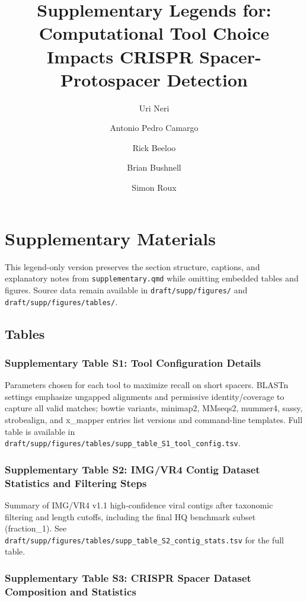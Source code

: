 \documentclass[
]{article}
\title{Supplementary Legends for: Computational Tool Choice Impacts
CRISPR Spacer-Protospacer Detection}
\author{Uri Neri \and Antonio Pedro Camargo \and Rick Beeloo \and Brian
Bushnell \and Simon Roux}
\date{}
\begin{document}
\maketitle


\section{Supplementary Materials}\label{supplementary-materials}

This legend-only version preserves the section structure, captions, and
explanatory notes from \texttt{supplementary.qmd} while omitting
embedded tables and figures. Source data remain available in
\texttt{draft/supp/figures/} and \texttt{draft/supp/figures/tables/}.

\subsection{Tables}\label{tables}

\subsubsection{Supplementary Table S1: Tool Configuration
Details}\label{tbl-supp-tool-config}

Parameters chosen for each tool to maximize recall on short spacers.
BLASTn settings emphasize ungapped alignments and permissive
identity/coverage to capture all valid matches; bowtie variants,
minimap2, MMseqs2, mummer4, sassy, strobealign, and x\_mapper entries
list versions and command-line templates. Full table is available in
\texttt{draft/supp/figures/tables/supp\_table\_S1\_tool\_config.tsv}.

\subsubsection{Supplementary Table S2: IMG/VR4 Contig Dataset Statistics
and Filtering Steps}\label{tbl-supp-contig-stats}

Summary of IMG/VR4 v1.1 high-confidence viral contigs after taxonomic
filtering and length cutoffs, including the final HQ benchmark subset
(fraction\_1). See
\texttt{draft/supp/figures/tables/supp\_table\_S2\_contig\_stats.tsv}
for the full table.

\subsubsection{Supplementary Table S3: CRISPR Spacer Dataset Composition
and Statistics}\label{tbl-supp-spacer-stats}
\end{document}
